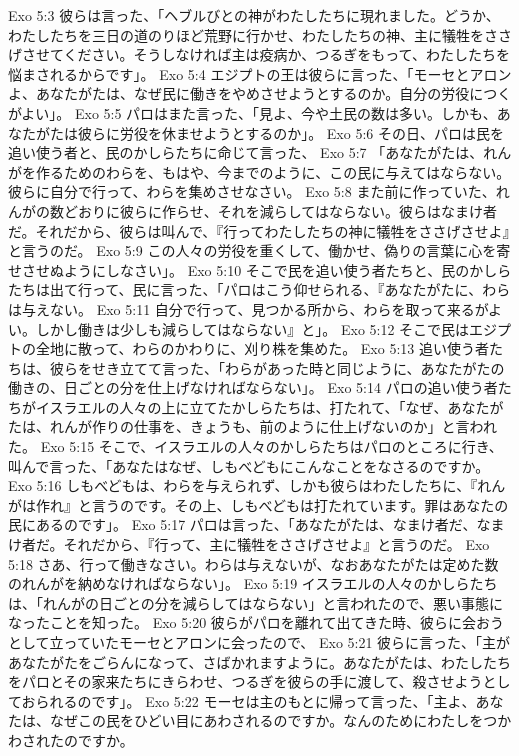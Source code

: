 Exo 5:3  彼らは言った、「ヘブルびとの神がわたしたちに現れました。どうか、わたしたちを三日の道のりほど荒野に行かせ、わたしたちの神、主に犠牲をささげさせてください。そうしなければ主は疫病か、つるぎをもって、わたしたちを悩まされるからです」。
Exo 5:4  エジプトの王は彼らに言った、「モーセとアロンよ、あなたがたは、なぜ民に働きをやめさせようとするのか。自分の労役につくがよい」。
Exo 5:5  パロはまた言った、「見よ、今や土民の数は多い。しかも、あなたがたは彼らに労役を休ませようとするのか」。
Exo 5:6  その日、パロは民を追い使う者と、民のかしらたちに命じて言った、
Exo 5:7  「あなたがたは、れんがを作るためのわらを、もはや、今までのように、この民に与えてはならない。彼らに自分で行って、わらを集めさせなさい。
Exo 5:8  また前に作っていた、れんがの数どおりに彼らに作らせ、それを減らしてはならない。彼らはなまけ者だ。それだから、彼らは叫んで、『行ってわたしたちの神に犠牲をささげさせよ』と言うのだ。
Exo 5:9  この人々の労役を重くして、働かせ、偽りの言葉に心を寄せさせぬようにしなさい」。
Exo 5:10  そこで民を追い使う者たちと、民のかしらたちは出て行って、民に言った、「パロはこう仰せられる、『あなたがたに、わらは与えない。
Exo 5:11  自分で行って、見つかる所から、わらを取って来るがよい。しかし働きは少しも減らしてはならない』と」。
Exo 5:12  そこで民はエジプトの全地に散って、わらのかわりに、刈り株を集めた。
Exo 5:13  追い使う者たちは、彼らをせき立てて言った、「わらがあった時と同じように、あなたがたの働きの、日ごとの分を仕上げなければならない」。
Exo 5:14  パロの追い使う者たちがイスラエルの人々の上に立てたかしらたちは、打たれて、「なぜ、あなたがたは、れんが作りの仕事を、きょうも、前のように仕上げないのか」と言われた。
Exo 5:15  そこで、イスラエルの人々のかしらたちはパロのところに行き、叫んで言った、「あなたはなぜ、しもべどもにこんなことをなさるのですか。
Exo 5:16  しもべどもは、わらを与えられず、しかも彼らはわたしたちに、『れんがは作れ』と言うのです。その上、しもべどもは打たれています。罪はあなたの民にあるのです」。
Exo 5:17  パロは言った、「あなたがたは、なまけ者だ、なまけ者だ。それだから、『行って、主に犠牲をささげさせよ』と言うのだ。
Exo 5:18  さあ、行って働きなさい。わらは与えないが、なおあなたがたは定めた数のれんがを納めなければならない」。
Exo 5:19  イスラエルの人々のかしらたちは、「れんがの日ごとの分を減らしてはならない」と言われたので、悪い事態になったことを知った。
Exo 5:20  彼らがパロを離れて出てきた時、彼らに会おうとして立っていたモーセとアロンに会ったので、
Exo 5:21  彼らに言った、「主があなたがたをごらんになって、さばかれますように。あなたがたは、わたしたちをパロとその家来たちにきらわせ、つるぎを彼らの手に渡して、殺させようとしておられるのです」。
Exo 5:22  モーセは主のもとに帰って言った、「主よ、あなたは、なぜこの民をひどい目にあわされるのですか。なんのためにわたしをつかわされたのですか。
